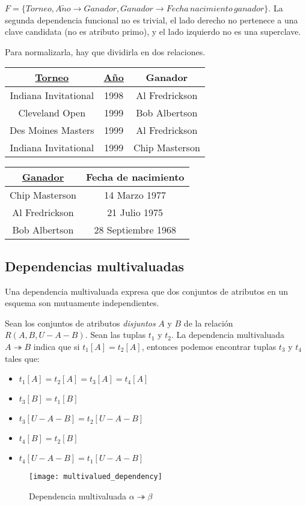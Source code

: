 \documentclass[a4paper, twoside]{article}
\begin{document}
$F=\{Torneo,A\tilde{n}o\to Ganador,Ganador\to Fecha\, nacimiento\, ganador\}$.
La segunda dependencia funcional no es trivial, el lado derecho no
pertenece a una clave candidata (no es atributo primo), y el lado
izquierdo no es una superclave.

Para normalizarla, hay que dividirla en dos relaciones.

\begin{tabular}{|c|c|c|}
\hline 
\uline{Torneo} & \uline{Año} & Ganador\\
\hline 
\hline 
Indiana Invitational  & 1998 & Al Fredrickson \\
\hline 
Cleveland Open  & 1999 & Bob Albertson \\
\hline 
Des Moines Masters  & 1999 & Al Fredrickson \\
\hline 
Indiana Invitational  & 1999 & Chip Masterson \\
\hline 
\end{tabular}%
\begin{tabular}{|c|c|}
\hline 
\uline{Ganador} & Fecha de nacimiento\\
\hline 
\hline 
Chip Masterson  & 14 Marzo 1977\\
\hline 
Al Fredrickson  & 21 Julio 1975\\
\hline 
Bob Albertson  & 28 Septiembre 1968\\
\hline 
\end{tabular}


\subsection{Dependencias multivaluadas}

Una dependencia multivaluada expresa que dos conjuntos de atributos
en un esquema son mutuamente independientes.

Sean los conjuntos de atributos \emph{disjuntos} $A$ y $B$ de la
relación $R(A,B,U-A-B)$. Sean las tuplas $t_{1}$ y $t_{2}$. La
dependencia multivaluada $A\twoheadrightarrow B$ indica que si $t_{1}[A]=t_{2}[A]$,
entonces podemos encontrar tuplas $t_{3}$ y $t_{4}$ tales que:
\begin{itemize}
\item $t_{1}[A]=t_{2}[A]=t_{3}[A]=t_{4}[A]$
\item $t_{3}[B]=t_{1}[B]$
\item $t_{3}[U-A-B]=t_{2}[U-A-B]$
\item $t_{4}[B]=t_{2}[B]$
\item $t_{4}[U-A-B]=t_{1}[U-A-B]$
\end{itemize}
\begin{figure}[H]
\noindent \begin{centering}
\texttt{[image: multivalued\_dependency]}
\par\end{centering}

\protect\caption{Dependencia multivaluada $\alpha\twoheadrightarrow\beta$}
\end{figure}
\end{document}
